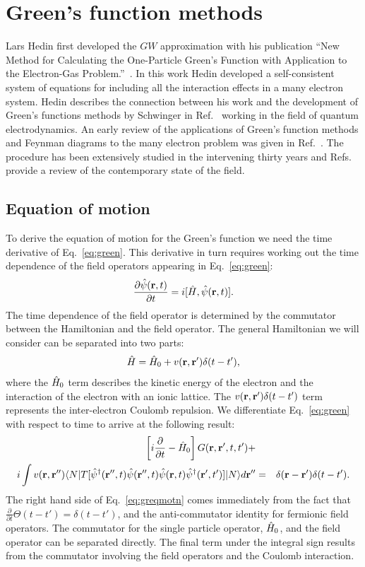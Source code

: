 \section{Green's function methods}
\noindent
Lars Hedin first developed the $GW$ approximation with
his publication ``New Method for Calculating the One-Particle Green's Function
with Application to the Electron-Gas Problem.''~\cite{hedin65}. In this work Hedin developed a
self-consistent system of equations for including all the interaction effects
in a many electron system. Hedin describes the
connection between his work and the development of Green's
functions methods by Schwinger in Ref.~\cite{schwinger51} 
working in the field of quantum electrodynamics.
An early review of the applications of Green's function methods and
Feynman diagrams to the many electron problem was given in Ref.~\cite{pratt63}. The procedure
has been extensively studied in the 
intervening thirty years and Refs.~\cite{aulbur00, aryasetgunnarsson98, onida02}
provide a review of the contemporary state of the field.
%
\subsection{Equation of motion}
\noindent
To derive the equation of motion for the Green's 
function we need the time derivative of Eq.~\ref{eq:green}. 
This derivative in turn requires working out the time 
dependence of the field operators appearing in Eq.~\ref{eq:green}:
%
\begin{equation}
\frac{\partial \hat{\psi}({\bf r},t)}{\partial t} = i[\hat{H},\hat{\psi}({\bf r},t)].
\end{equation}
%
The time dependence of the field operator is determined by the 
commutator between the Hamiltonian and the field operator.
%
The general Hamiltonian we will consider can be separated into two parts:
%
\begin{equation}
\hat{H} =  \hat{H}_{0} + v({\bf r},{\bf r}')\delta(t-t'),
\end{equation}
%
where the $\hat{H}_{0}$ term describes the kinetic energy of the electron and the interaction of the 
electron with an ionic lattice. 
The $v({\bf r},{\bf r}')\delta(t-t')$ term represents the inter-electron Coulomb repulsion.
We differentiate Eq.~\ref{eq:green} with respect to time to arrive at the following result:
%
\begin{align}
\label{eq:greqmotn}
\left[i\frac{\partial}{\partial t} - \hat{H}_{0}\right]G({\bf r},{\bf r}',t,t') +  & &  \nonumber \\
i\int v({\bf r},{\bf r}'')\langle N| T[\hat{\psi}^{\dagger}({\bf r}'',t)\hat{\psi}({\bf r}'',t)\hat{\psi}({\bf r},t)\hat{\psi}^{\dagger}({\bf r^\prime},t')] |N \rangle d{\bf r}'' & = & \delta({\bf r}-{\bf r^\prime})\delta(t-t').
\end{align}
%
The right hand side of Eq.~\ref{eq:greqmotn} comes immediately from 
the fact that $\frac{\partial}{\partial t}\Theta(t-t') =\delta(t-t')$, 
and the anti-commutator identity for fermionic field operators. 
%
The commutator for the single particle operator, $\hat{H}_{0}$, and the 
field operator can be separated directly. 
The final term under the integral sign results from the commutator
involving the field operators and the Coulomb interaction.

